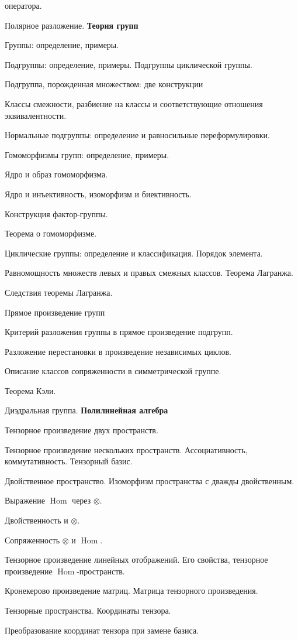 \documentclass[12pt]{article}
\DeclareMathOperator{\Hom}{Hom}
\newcommand\glava[1]{{\bf\hfill #1}}
\begin{document}
\begin{compactenum}
  оператора.
\item Полярное разложение.
\glava{Теория групп}
\item Группы: определение, примеры.
\item Подгруппы: определение, примеры. Подгруппы циклической группы.
\item Подгруппа, порожденная множеством: две конструкции
\item Классы смежности, разбиение на классы и соответствующие
  отношения эквивалентности.
\item Нормальные подгруппы: определение и равносильные
  переформулировки.
\item Гомоморфизмы групп: определение, примеры.
\item Ядро и образ гомоморфизма.
\item Ядро и инъективность, изоморфизм и биективность.
\item Конструкция фактор-группы.
\item Теорема о гомоморфизме.
\item Циклические группы: определение и классификация. Порядок
  элемента.
\item Равномощность множеств левых и правых смежных классов. Теорема
  Лагранжа.
\item Следствия теоремы Лагранжа.
\item Прямое произведение групп
\item Критерий разложения группы в прямое произведение подгрупп.
\item Разложение перестановки в произведение независимых циклов.
\item Описание классов сопряженности в симметрической группе.
\item Теорема Кэли.
\item Диэдральная группа.
\glava{Полилинейная алгебра}
\item Тензорное произведение двух пространств.
\item Тензорное произведение нескольких пространств. Ассоциативность,
  коммутативность. Тензорный базис.
\item Двойственное пространство. Изоморфизм пространства с дважды
  двойственным.
\item Выражение $\Hom$ через $\otimes$.
\item Двойственность и $\otimes$.
\item Сопряженность $\otimes$ и $\Hom$.
\item Тензорное произведение линейных отображений. Его свойства,
  тензорное произведение $\Hom$-пространств.
\item Кронекерово произведение матриц. Матрица тензорного
  произведения.
\item Тензорные пространства. Координаты тензора.
\item Преобразование координат тензора при замене базиса.
\end{compactenum}
\end{document}
